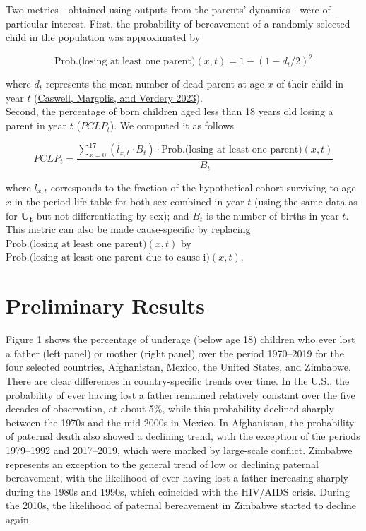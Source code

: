 \documentclass[
  11pt,
  letterpaper,
]{article}
\begin{document}
Two metrics - obtained using outputs from the parents' dynamics - were of particular interest. First, the probability of bereavement of a randomly selected child in the population was approximated by

\[\text{Prob.(losing at least one parent)}(x,t)=1-(1-d_t/2)^2\]

where \(d_t\) represents the mean number of dead parent at age \(x\) of their child in year \(t\) (\protect\hyperlink{ref-caswell2023formal}{Caswell, Margolis, and Verdery 2023}).\\
Second, the percentage of born children aged less than 18 years old losing a parent in year \(t\) (\(PCLP_t\)). We computed it as follows

\[PCLP_t = \frac{\sum^{17}_{x=0}(l_{x,t} \cdot B_t) \cdot \text{Prob.(losing at least one parent)}(x,t)}{B_t}\]

where \(l_{x,t}\) corresponds to the fraction of the hypothetical cohort surviving to age \(x\) in the period life table for both sex combined in year \(t\) (using the same data as for \(\boldsymbol{U_t}\) but not differentiating by sex); and \(B_t\) is the number of births in year \(t\). This metric can also be made cause-specific by replacing \(\text{Prob.(losing at least one parent)}(x,t)\) by \(\text{Prob.(losing at least one parent due to cause i)}(x,t)\).

\hypertarget{preliminary-results}{%
\section{Preliminary Results}\label{preliminary-results}}

Figure 1 shows the percentage of underage (below age 18) children who ever lost a father (left panel) or mother (right panel) over the period 1970--2019 for the four selected countries, Afghanistan, Mexico, the United States, and Zimbabwe. There are clear differences in country-specific trends over time. In the U.S., the probability of ever having lost a father remained relatively constant over the five decades of observation, at about 5\%, while this probability declined sharply between the 1970s and the mid-2000s in Mexico. In Afghanistan, the probability of paternal death also showed a declining trend, with the exception of the periods 1979--1992 and 2017--2019, which were marked by large-scale conflict. Zimbabwe represents an exception to the general trend of low or declining paternal bereavement, with the likelihood of ever having lost a father increasing sharply during the 1980s and 1990s, which coincided with the HIV/AIDS crisis. During the 2010s, the likelihood of paternal bereavement in Zimbabwe started to decline again.
\end{document}
